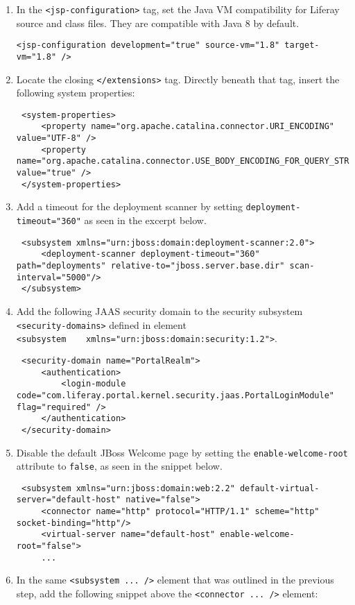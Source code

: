 \begin{enumerate}
\def\labelenumi{\arabic{enumi}.}
\item
  In the \texttt{\textless{}jsp-configuration\textgreater{}} tag, set
  the Java VM compatibility for Liferay source and class files. They are
  compatible with Java 8 by default.

\begin{verbatim}
<jsp-configuration development="true" source-vm="1.8" target-vm="1.8" />
\end{verbatim}
\item
  Locate the closing \texttt{\textless{}/extensions\textgreater{}} tag.
  Directly beneath that tag, insert the following system properties:

\begin{verbatim}
 <system-properties>
     <property name="org.apache.catalina.connector.URI_ENCODING" value="UTF-8" />
     <property name="org.apache.catalina.connector.USE_BODY_ENCODING_FOR_QUERY_STRING" value="true" />
 </system-properties>
\end{verbatim}
\item
  Add a timeout for the deployment scanner by setting
  \texttt{deployment-timeout="360"} as seen in the excerpt below.

\begin{verbatim}
 <subsystem xmlns="urn:jboss:domain:deployment-scanner:2.0">
     <deployment-scanner deployment-timeout="360" path="deployments" relative-to="jboss.server.base.dir" scan-interval="5000"/>
 </subsystem>
\end{verbatim}
\item
  Add the following JAAS security domain to the security subsystem
  \texttt{\textless{}security-domains\textgreater{}} defined in element
  \texttt{\textless{}subsystem\ \ \ \ xmlns="urn:jboss:domain:security:1.2"\textgreater{}}.

\begin{verbatim}
 <security-domain name="PortalRealm">
     <authentication>
         <login-module code="com.liferay.portal.kernel.security.jaas.PortalLoginModule" flag="required" />
     </authentication>
 </security-domain>
\end{verbatim}
\item
  Disable the default JBoss Welcome page by setting the
  \texttt{enable-welcome-root} attribute to \texttt{false}, as seen in
  the snippet below.

\begin{verbatim}
 <subsystem xmlns="urn:jboss:domain:web:2.2" default-virtual-server="default-host" native="false">
     <connector name="http" protocol="HTTP/1.1" scheme="http" socket-binding="http"/>
     <virtual-server name="default-host" enable-welcome-root="false">
     ...
\end{verbatim}
\item
  In the same \texttt{\textless{}subsystem\ ...\ /\textgreater{}}
  element that was outlined in the previous step, add the following
  snippet above the \texttt{\textless{}connector\ ...\ /\textgreater{}}
  element:


\end{enumerate}
